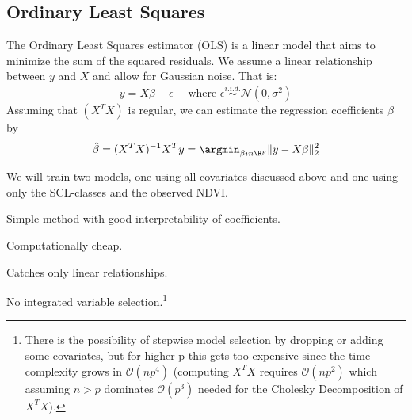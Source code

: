 
\subsection{Ordinary Least Squares}{\label{sec:corr_model_OLS}
    The Ordinary Least Squares estimator (OLS) is a linear model that aims to minimize the sum of the squared residuals. We assume a linear relationship between $y$ and $X$ and allow for Gaussian noise. That is:
    \begin{equation}
        \label{eq:ols}
        y = X\beta  + \epsilon \quad \text{ where }\epsilon \overset{i.i.d.}{\sim}\mathcal{N}(0,\sigma^2)
    \end{equation}
    Assuming that $(X^TX)$ is regular, we can estimate the regression coefficients $\beta$ by
    \begin{equation}
        \hat \beta = (X^TX)^{-1}X^Ty = \argmin_{\beta in \R^p}\|y - X\beta\|_2^2 
    \end{equation}

    We will train two models, one using all covariates discussed above and one using only the SCL-classes and the observed NDVI. 

    \begin{my_pros_cons_table}{
        \item Simple method with good interpretability of coefficients.
        \item Computationally cheap.
    }{
        \item Catches only linear relationships.
        \item No integrated variable selection.\footnote{There is the possibility of stepwise model selection by dropping or adding some covariates, but for higher p this gets too expensive since the time complexity grows in $\mathcal{O}(np^4)$ (computing $X^TX$ requires $\mathcal{O}(np^2)$ which assuming $n>p$ dominates $\mathcal{O}(p^3) $ needed for the Cholesky Decomposition of $X^TX$). %
        }
    }
    \end{my_pros_cons_table}
}
